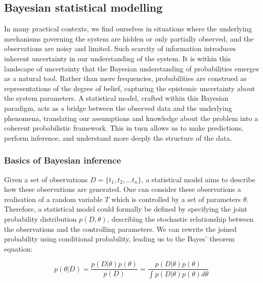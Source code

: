 \subsection{Bayesian statistical modelling}
\label{sec:bayesian-intro}

In many practical contexts, we find ourselves in situations where the underlying mechanisms governing the system are hidden or only partially observed, and the observations are noisy and limited. Such scarcity of information introduces inherent uncertainty in our understanding of the system. It is within this landscape of uncertainty that the Bayesian understanding of probabilities emerges as a natural tool. Rather than mere frequencies, probabilities are construed as representations of the degree of belief, capturing the epistemic uncertainty about the system parameters. A statistical model, crafted within this Bayesian paradigm, acts as a bridge between the observed data and the underlying phenomena, translating our assumptions and knowledge about the problem into a coherent probabilistic framework. This in turn allows us to make predictions, perform inference, and understand more deeply the structure of the data.

\subsubsection*{Basics of Bayesian inference}
Given a set of observations ${D} = \{t_1, t_2, … t_n\}$, a statistical model aims to describe how these observations are generated. One can consider these observations a realisation of a random variable $T$ which is controlled by a set of parameters $\theta$. Therefore, a statistical model could formally be defined by specifying the joint probability distribution $p({D}, \theta)$, describing the stochastic relationship between the observations and the controlling parameters. We can rewrite the joined probability using conditional probability, leading us to the Bayes' theorem equation:

\begin{equation}
p(\theta | {D}) = \frac{p({D} | \theta) p(\theta)}{p({D})} = \frac{p({D} | \theta) p(\theta)}{\int p({D} | \theta) p(\theta) d\theta}
\end{equation}

